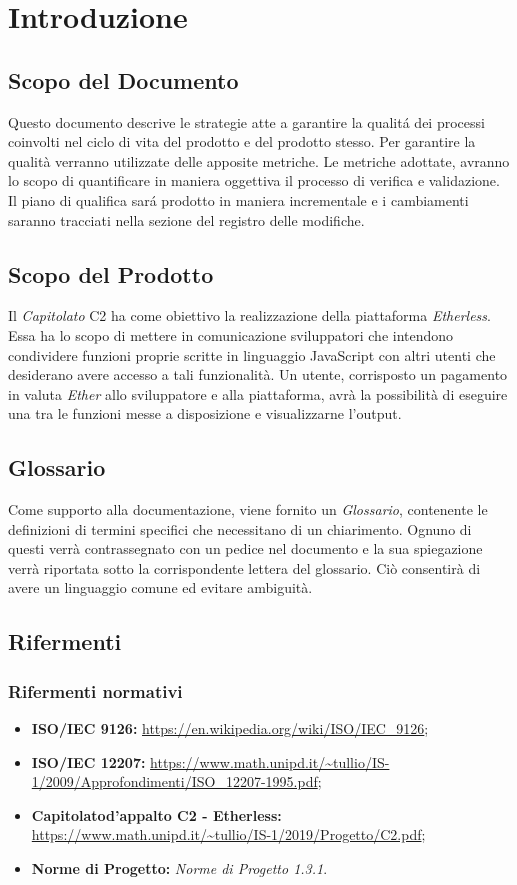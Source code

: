 \section{Introduzione}

\subsection{Scopo del Documento}
Questo documento descrive le strategie atte a garantire la qualit\'a dei processi coinvolti nel ciclo di vita del prodotto e del prodotto stesso. Per garantire la qualità verranno utilizzate delle apposite metriche. Le metriche adottate, avranno lo scopo di quantificare in maniera oggettiva il processo di verifica e validazione. Il piano di qualifica sar\'a prodotto in maniera incrementale e i cambiamenti saranno tracciati nella sezione del registro delle modifiche.


\subsection{Scopo del Prodotto}
Il \textit{Capitolato\glo} C2 ha come obiettivo la realizzazione della piattaforma \textit{Etherless}. Essa ha lo scopo di mettere in comunicazione sviluppatori che intendono condividere funzioni proprie scritte in linguaggio JavaScript con altri utenti che desiderano avere accesso a tali funzionalità. Un utente, corrisposto un pagamento in valuta \textit{Ether\glo} allo sviluppatore e alla piattaforma, avrà la possibilità di eseguire una tra le funzioni messe a disposizione e visualizzarne l'output. 

\subsection{Glossario}
Come supporto alla documentazione, viene fornito un \textit{Glossario}\docs,
contenente le definizioni di termini specifici che necessitano di un chiarimento.
Ognuno di questi verr\`a contrassegnato con un pedice \glo nel documento e la sua
spiegazione verr\`a riportata sotto la corrispondente lettera del glossario. Ci\`o
consentir\`a di avere un linguaggio comune ed evitare ambiguit\`a.

\subsection{Rifermenti}
\subsubsection{Rifermenti normativi}
\begin{itemize}
\item \textbf{ISO/IEC 9126:} \url{https://en.wikipedia.org/wiki/ISO/IEC_9126};
\item \textbf{ISO/IEC 12207:} \url{https://www.math.unipd.it/~tullio/IS-1/2009/Approfondimenti/ISO_12207-1995.pdf};
\item \textbf{Capitolato\glo d'appalto C2 - Etherless:} \url{https://www.math.unipd.it/~tullio/IS-1/2019/Progetto/C2.pdf};
\item \textbf{Norme di Progetto:} \textit{Norme di Progetto 1.3.1\docs}.
\end{itemize}
